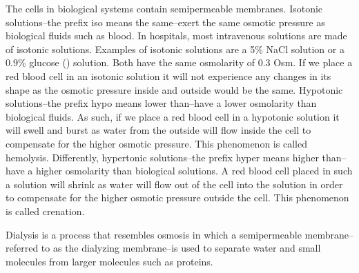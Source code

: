\documentclass[main.tex]{subfiles}
\begin{document}
\begin{description}
\begin{center}
\begin{minipage}[b]{1.3\linewidth}
{\begin{tikzpicture}
\end{tikzpicture}}\end{minipage}\end{center}


 
\item[\docfilehook{Isotonic, hypotonic and hypertonic solutions}{}] 
The cells in biological systems contain semipermeable membranes. Isotonic solutions--the prefix iso means the same--exert the same osmotic pressure as biological fluids such as blood. In hospitals, most intravenous solutions are made of isotonic solutions. Examples of isotonic solutions are a 5\% NaCl solution or a 0.9\% glucose () solution. Both have the same osmolarity of 0.3 Osm. If we place a red blood cell in an isotonic solution it will not experience any changes in its shape as the osmotic pressure inside and outside would be the same. 
Hypotonic solutions--the prefix hypo means lower than--have a lower osmolarity than biological fluids. As such, if we place a red blood cell in a hypotonic solution it will swell and burst as water from the outside will flow inside the cell to compensate for the higher osmotic pressure. This phenomenon is called hemolysis. Differently, hypertonic solutions--the prefix hyper means higher than--have a higher osmolarity than biological solutions. A red blood cell placed in such a solution will shrink as water will flow out of the cell into the solution in order to compensate for the higher osmotic pressure outside the cell. This phenomenon is called crenation.
\item[\docfilehook{Dialisis}{}] 
Dialysis is a process that resembles osmosis in which a semipermeable membrane--referred to as the dialyzing membrane--is used to separate water and small molecules from larger molecules such as proteins.


\end{description}
\end{document}
